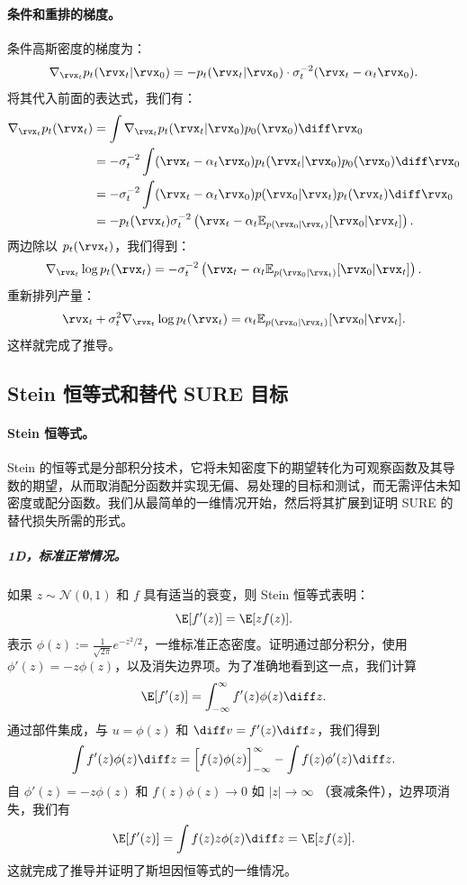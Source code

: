 \paragraph{条件和重排的梯度。}
条件高斯密度的梯度为：
\begin{align*}
\nabla_{\rvx_t} p_t(\rvx_t|\rvx_0)
= -p_t(\rvx_t|\rvx_0) \cdot \sigma_t^{-2} (\rvx_t - \alpha_t \rvx_0).
\end{align*}
将其代入前面的表达式，我们有：
\begin{align*}
\nabla_{\rvx_t} p_t(\rvx_t)
&= \int \nabla_{\rvx_t} p_t(\rvx_t|\rvx_0)  p_0(\rvx_0)  \diff\rvx_0 \\
&= -\sigma_t^{-2} \int (\rvx_t - \alpha_t \rvx_0)  p_t(\rvx_t|\rvx_0)  p_0(\rvx_0)  \diff\rvx_0 \\
&= -\sigma_t^{-2} \int (\rvx_t - \alpha_t \rvx_0)  p(\rvx_0|\rvx_t)  p_t(\rvx_t)  \diff\rvx_0 \\
&= -p_t(\rvx_t)  \sigma_t^{-2} \left(\rvx_t - \alpha_t  \mathbb{E}_{p(\rvx_0|\rvx_t)}[\rvx_0\vert \rvx_t] \right).
\end{align*}
两边除以 $p_t(\rvx_t)$，我们得到：
\begin{align*}
\nabla_{\rvx_t} \log p_t(\rvx_t)
= -\sigma_t^{-2} \left(\rvx_t - \alpha_t  \mathbb{E}_{p(\rvx_0|\rvx_t)}[\rvx_0\vert \rvx_t] \right).
\end{align*}
重新排列产量：
\begin{align*}
\rvx_t + \sigma_t^{2} \nabla_{\rvx_t} \log p_t(\rvx_t)
= \alpha_t  \mathbb{E}_{p(\rvx_0|\rvx_t)}[\rvx_0\vert \rvx_t].
\end{align*}
这样就完成了推导。

\subsection{Stein 恒等式和替代 SURE 目标}\label{app-sec:stein-identity}

\paragraph{Stein 恒等式。} Stein 的恒等式是分部积分技术，它将未知密度下的期望转化为可观察函数及其导数的期望，从而取消配分函数并实现无偏、易处理的目标和测试，而无需评估未知密度或配分函数。我们从最简单的一维情况开始，然后将其扩展到证明 SURE 的替代损失所需的形式。
\subparagraph{1D，标准正常情况。}
如果 $z \sim \mathcal{N}(0,1)$ 和 $f$ 具有适当的衰变，则 Stein 恒等式表明：
\[
\E[f'(z)]  =  \E[z f(z)] .
\]
表示 $\phi(z) := \tfrac{1}{\sqrt{2\pi}}  e^{-z^2/2}$，一维标准正态密度。证明通过部分积分，使用 $\phi'(z) = -z\phi(z)$，以及消失边界项。为了准确地看到这一点，我们计算
\[
\E[f'(z)]
= \int_{-\infty}^{\infty} f'(z)  \phi(z)  \diff z.
\]
通过部件集成，与 $u=\phi(z)$ 和 $\diff v=f'(z)  \diff z$，我们得到
\[
\int f'(z)  \phi(z)  \diff z
= \Big[ f(z)  \phi(z) \Big]_{-\infty}^{\infty}
- \int f(z)  \phi'(z)  \diff z.
\]
自 $\phi'(z) = -z\phi(z)$ 和 $f(z)\phi(z)\to 0$ 如 $|z|\to\infty$ （衰减条件），边界项消失，我们有
\[
\E[f'(z)]  =  \int f(z)  z  \phi(z)  \diff z  =  \E[z f(z)].
\]
这就完成了推导并证明了斯坦因恒等式的一维情况。


